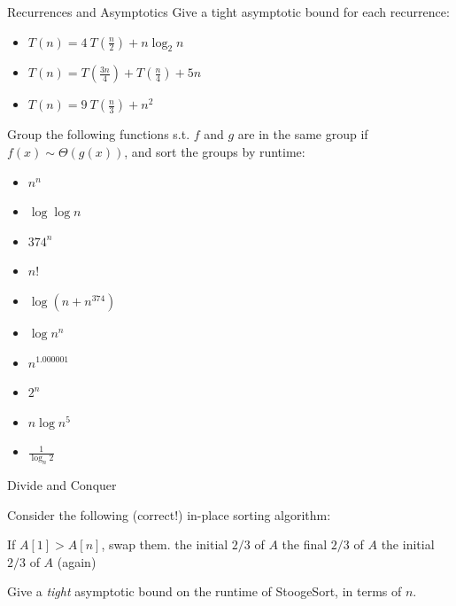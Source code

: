 \documentclass{beamer}
\begin{document}
\begin{frame}[t]{Recurrences and Asymptotics}
    Give a tight asymptotic bound for each recurrence:
    \begin{itemize}
        \item $T(n) = 4\>T(\frac{n}{2}) + n \log_2 n$
        \item \pause $T(n) = T(\frac{3n}{4}) + T(\frac{n}{4}) + 5n$
        \item \pause $T(n) = 9\> T(\frac{n}{3}) + n^2$
    \end{itemize}    
    \pause Group the following functions s.t. $f$ and $g$ are in the same group if $f(x) \sim \Theta(g(x))$, and sort the groups by runtime:
    \begin{itemize}
        \item $n^n$
        \item $\log \log n$ 
        \item $374^n$
        \item $n!$
        \item $\log (n + n^{374})$ 
        \item $\log n^n$
        \item $n^{1.000001}$
        \item $2^n$
        \item $n \log n^5$
        \item $\frac{1}{\log_n 2}$
    \end{itemize}
    
\end{frame}

\begin{frame}[t]{Divide and Conquer}

Consider the following (correct!) in-place sorting algorithm:

\begin{algorithmic}[1]
        \State If $A[1] > A[n]$, swap them.
            \State {} the initial $2/3$ of $A$
            \State {} the final $2/3$ of $A$
            \State {} the initial $2/3$ of $A$ (again)
        \EndIf
    \EndProcedure
\end{algorithmic}

Give a \emph{tight} asymptotic bound on the runtime of StoogeSort, in terms of $n$.

\end{frame}
\end{document}
